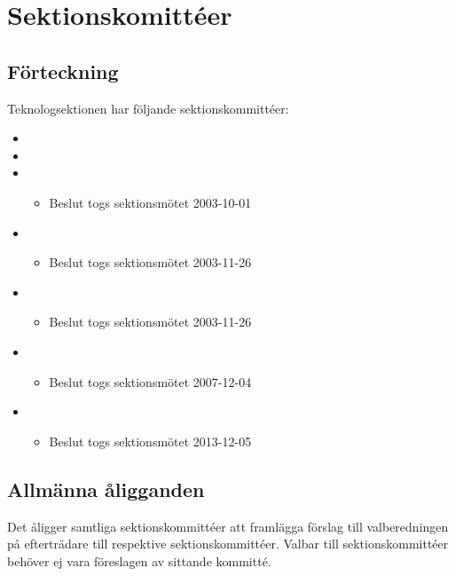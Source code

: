 \section{Sektionskomittéer}

\subsection{Förteckning}
Teknologsektionen har följande sektionskommittéer:

\begin{itemize}
	\item \SEXITFULL
	\item \NOLLKITFULL
	\item \PRITFULL
	\begin{itemize}
		\item Beslut togs sektionsmötet 2003-10-01
	\end{itemize}
	\item \FRITIDFULL
	\begin{itemize}
		\item Beslut togs sektionsmötet 2003-11-26
	\end{itemize}
	\item \ARMITFULL
	\begin{itemize}
		\item Beslut togs sektionsmötet 2003-11-26
	\end{itemize}
	\item \DIGITFULL
	\begin{itemize}
		\item Beslut togs sektionsmötet 2007-12-04 
	\end{itemize}
	\item \FANBARERITFULL
	\begin{itemize}
		\item Beslut togs sektionsmötet 2013-12-05 
	\end{itemize}

\end{itemize}

\subsection{Allmänna åligganden}
Det åligger samtliga sektionskommittéer att framlägga förslag till valberedningen på efterträdare till respektive sektionskommittéer. Valbar till sektionskommittéer behöver ej vara föreslagen av sittande kommitté.

\newpage

\newpage

\newpage

\newpage

\newpage

\newpage

\newpage

